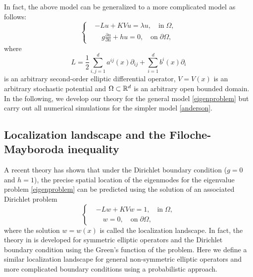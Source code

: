 \documentclass[a4paper,11pt]{article}
\begin{document}
In fact, the above model can be generalized to a more complicated model as follows:
\begin{equation}\label{eigenproblem}
\left\{
\begin{split}
& - L u + K V u = \lambda u, \quad\textrm{in}\;\Omega, \\
& \quad g \frac{\partial u}{\partial n} + h u = 0, \quad \textrm{on} \; \partial \Omega,
\end{split}
\right.
\end{equation}
where
\begin{equation}\label{operator}
L = \frac{1}{2} \sum_{i,j=1}^{d} a^{ij}(x) \partial_{ij} + \sum_{i=1}^{d} b^i(x) \partial_i
\end{equation}
is an arbitrary second-order elliptic differential operator, $V = V(x)$ is an arbitrary stochastic potential and $\Omega \subset \mathbb{R}^d$ is an arbitrary open bounded domain. In the following, we develop our theory for the general model \eqref{eigenproblem} but carry out all numerical simulations for the simpler model \eqref{anderson}.

\subsection{Localization landscape and the Filoche-Mayboroda inequality}

A recent theory \cite{filoche2012universal} has shown that under the Dirichlet boundary condition ($g = 0$ and $h = 1$), the precise spatial location of the eigenmodes for the eigenvalue problem \eqref{eigenproblem} can be predicted using the solution of an associated Dirichlet problem
\begin{equation}\label{landDirichlet}
\left\{
\begin{split}
& -L w + K V w = 1, \quad \textrm{in} \; \Omega, \\
& \quad w = 0, \quad \textrm{on} \; \partial \Omega,
\end{split}
\right.
\end{equation}
where the solution $w = w(x)$ is called the localization landscape. In fact, the theory in \cite{filoche2012universal} is developed for symmetric elliptic operators and the Dirichlet boundary condition using the Green's function of the problem. Here we define a similar localization landscape for general non-symmetric elliptic operators and more complicated boundary conditions using a probabilistic approach.
\end{document}
